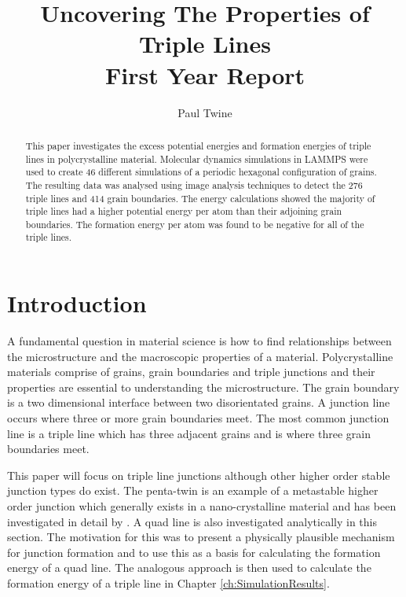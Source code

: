 \documentclass[12pt,a4paper,openany]{report}
\begin{document}
\title{Uncovering The Properties of Triple Lines \\
First Year Report}
\author{Paul Twine}
\date{}


\maketitle
\tableofcontents
\listoffigures

\begin{abstract}
This paper investigates the excess potential energies and formation energies of triple lines in polycrystalline material. Molecular dynamics simulations in LAMMPS were used to create 46 different simulations of a periodic hexagonal configuration of grains. The resulting data was analysed using image analysis techniques to detect the 276 triple lines and 414 grain boundaries. The energy calculations showed the majority of triple lines had a higher potential energy per atom than their adjoining grain boundaries. The formation energy per atom was found to be negative for all of the triple lines.
\end{abstract}

\chapter{Introduction} \label{ch:Intro}

A fundamental question in material science is how to find relationships between the microstructure and the macroscopic properties of a material. Polycrystalline materials comprise of grains, grain boundaries and triple junctions and their properties are essential to understanding the microstructure. The grain boundary is a two dimensional interface between two disorientated grains. A junction line occurs where three or more grain boundaries meet. The most common junction line is a triple line which has three adjacent grains and is where three grain boundaries meet. 

This paper will focus on triple line junctions although other higher order stable junction types do exist. The penta-twin is an example of a metastable higher order junction which generally exists in a nano-crystalline material and has been investigated in detail by \cite{Thomas2016}. A quad line is also investigated analytically in this section. The motivation for this was to present a physically plausible mechanism for junction formation and to use this as a basis for calculating the formation energy of a quad line. The analogous approach is then used to calculate the formation energy of a triple line in Chapter \ref{ch:SimulationResults}. 
\end{document}
